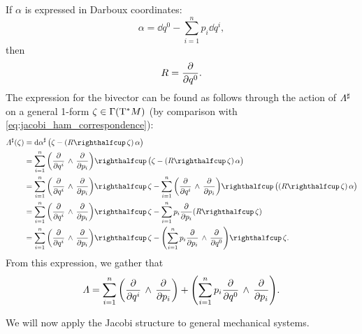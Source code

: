If \(\alpha\) is expressed in Darboux coordinates:
\begin{equation}
     \alpha = \dd{q}^0 - \sum^n_{i = 1} p_i\dd{q^i},
\end{equation}
then
\begin{equation}
     R = \pdv{}{q^0}.
\end{equation}
The expression for the bivector can be found as follows through the action of \(
\Lambda^\sharp\) on a general 1-form \(\zeta \in \mathrm{\Gamma}\qty(\mathrm{T}^*M)\) (by comparison with \cref{eq:jacobi_ham_correspondence}):
\begin{equation}
    \begin{split}
        \fromDual{\Lambda}(\zeta) &= \fromDual{\dd{\alpha}}\big(\zeta - (\intpr{R}{\zeta})\,\alpha\big) \\
                                 &= \intpr{\sum_{i=1}^n\qty(\wedgep{\pdv{}{q^i}}{\pdv{}{p_i}})}{\big(\zeta - (\intpr{R}{\zeta})\,\alpha\big)} \\
                                 &= \intpr{\sum_{i=1}^n\qty(\wedgep{\pdv{}{q^i}}{\pdv{}{p_i}})}{\zeta} 
                                    - \intpr{\sum_{i=1}^n\qty(\wedgep{\pdv{}{q^i}}{\pdv{}{p_i}})}{\big((\intpr{R}{\zeta})\,\alpha\big)} \\
                                 &= \intpr{\sum_{i=1}^n\qty(\wedgep{\pdv{}{q^i}}{\pdv{}{p_i}})}{\zeta} 
                                    - \sum_{i=1}^n p_i \pdv{}{p_i}(\intpr{R}{\zeta}) (\intpr{R}{\zeta})\\
                                 &= \intpr{\sum_{i=1}^n\qty(\wedgep{\pdv{}{q^i}}{\pdv{}{p_i}})}{\zeta} 
                                    - \intpr{\qty(\sum_{i=1}^n p_i \wedgep{\pdv{}{p_i}}{\pdv{}{q^0}})}{\zeta}. \\
    \end{split}
\end{equation}
From this expression, we gather that 
\begin{equation}
     \Lambda = \sum_{i=1}^n \qty( \pdv{}{q^i}\,\wedge\,\pdv{}{p_i} ) + \qty(\sum_{i=1}^n p_i  \pdv{}{q^0}\,\wedge\,\pdv{}{p_i} ).
\end{equation}

We will now apply the Jacobi structure to general mechanical systems.

